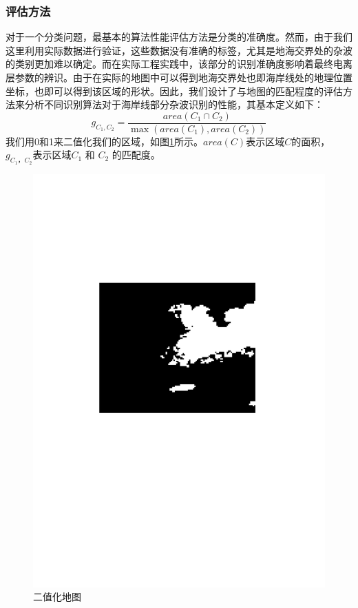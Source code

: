 \subsubsection{评估方法}
对于一个分类问题，最基本的算法性能评估方法是分类的准确度。然而，由于我们这里利用实际数据进行验证，这些数据没有准确的标签，尤其是地海交界处的杂波的类别更加难以确定。而在实际工程实践中，该部分的识别准确度影响着最终电离层参数的辨识。由于在实际的地图中可以得到地海交界处也即海岸线处的地理位置坐标，也即可以得到该区域的形状。因此，我们设计了与地图的匹配程度的评估方法来分析不同识别算法对于海岸线部分杂波识别的性能，其基本定义如下：
\begin{equation}
g_{C_1, C_2} = \frac{area({C_1\cap C_2})}{\max(area({C_1}), area({C_2}))}
\end{equation}
我们用0和1来二值化我们的区域，如图\ref{fig:binary}所示。$area(C)$表示区域$C$的面积， $g_{C_1， C_2}$表示区域$C_1$ 和 $C_2$ 的匹配度。
\begin{figure}[H]
	\centering
	\includegraphics[height=0.25\textheight]{figures/othr/binary}
	\caption{二值化地图}
	\label{fig:binary}
\end{figure}

